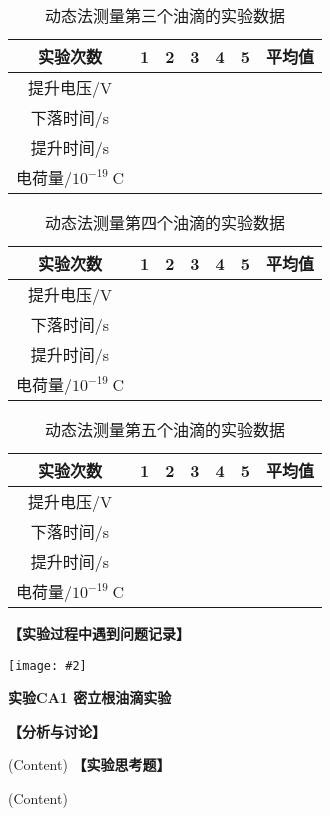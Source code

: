 \documentclass[11pt,a4paper]{ctexart}
\newcommand{\ExpeName}{实验CA1 密立根油滴实验}
\newcommand{\cpic}[2]{
\begin{center}
\texttt{[image: \#2]}
\end{center}
}
\begin{document}
\begin{table}[h!]
\centering
\caption{动态法测量第三个油滴的实验数据}
\label{my-label}
\begin{tabular}{|c|p{12mm}|p{12mm}|p{12mm}|p{12mm}|p{12mm}|p{12mm}|}
\hline
实验次数 & 1 & 2 & 3 & 4 & 5 & 平均值 \\ \hline
提升电压/V &  &  &  &  &  &  \\ \hline
下落时间/s &  &  &  &  &  &  \\ \hline
提升时间/s &  &  &  &  &  &  \\ \hline
电荷量/$10^{-19}\mathrm{\ C}$ &  &  &  &  &  &  \\ \hline
\end{tabular}
\end{table}
\newpage
\begin{table}[h!]
\centering
\caption{动态法测量第四个油滴的实验数据}
\label{my-label}
\begin{tabular}{|c|p{12mm}|p{12mm}|p{12mm}|p{12mm}|p{12mm}|p{12mm}|}
\hline
实验次数 & 1 & 2 & 3 & 4 & 5 & 平均值 \\ \hline
提升电压/V &  &  &  &  &  &  \\ \hline
下落时间/s &  &  &  &  &  &  \\ \hline
提升时间/s &  &  &  &  &  &  \\ \hline
电荷量/$10^{-19}\mathrm{\ C}$ &  &  &  &  &  &  \\ \hline
\end{tabular}
\end{table}
\begin{table}[h!]
\centering
\caption{动态法测量第五个油滴的实验数据}
\label{my-label}
\begin{tabular}{|c|p{12mm}|p{12mm}|p{12mm}|p{12mm}|p{12mm}|p{12mm}|}
\hline
实验次数 & 1 & 2 & 3 & 4 & 5 & 平均值 \\ \hline
提升电压/V &  &  &  &  &  &  \\ \hline
下落时间/s &  &  &  &  &  &  \\ \hline
提升时间/s &  &  &  &  &  &  \\ \hline
电荷量/$10^{-19}\mathrm{\ C}$ &  &  &  &  &  &  \\ \hline
\end{tabular}
\end{table}
\textbf{【实验过程中遇到问题记录】}

%

\newpage%
\cpic{0.255}{e3}%
\begin{center}
\LARGE\textbf{{\ExpeName}}
\end{center}
\textbf{【分析与讨论】}\par
(Content)
\newline
\textbf{【实验思考题】}\par
(Content)
\end{document}
